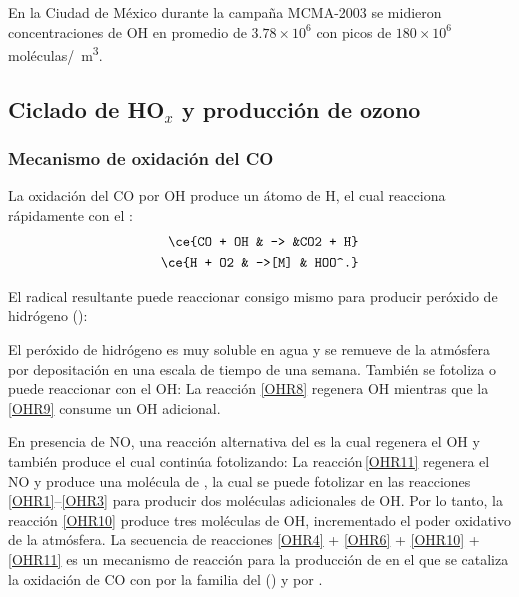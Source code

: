 En la Ciudad de M\'exico durante la campa\~na \gls{MCMA}-2003 se midieron concentraciones de OH en promedio de  $3.78\times10^6$ con picos de $180\times10^6$ mol\'eculas/\si{\centi\cubic\metre}.

\subsection{Ciclado de HO$_x$ y producci\'on de ozono}
\subsubsection{Mecanismo de oxidaci\'on del CO}\label{ciclado}

La oxidaci\'on del CO por OH produce un \'atomo de H, el cual reacciona r\'apidamente con el :
\begin{eqnarray}
\ce{CO + OH & -> &CO2 + H} \label{OHR4}  \\
\ce{H + O2  & ->[M]  & HOO^.}  \label{OHR6} 
\end{eqnarray}

El radical resultante  puede reaccionar consigo mismo para producir per\'oxido de hidr\'ogeno ():


El per\'oxido de hidr\'ogeno es muy soluble en agua y se remueve de la atm\'osfera por depositaci\'on en una escala de tiempo de una semana. Tambi\'en  se  fotoliza o puede  reaccionar con el OH:
La reacci\'on \ref{OHR8} regenera OH mientras que la \ref{OHR9} consume un OH adicional.

En presencia de NO, una reacci\'on alternativa del  es
la cual regenera el OH y tambi\'en produce  el cual contin\'ua fotolizando:
La reacci\'on\,\ref{OHR11} regenera el NO y produce una mol\'ecula de , la cual se puede fotolizar en las reacciones \ref{OHR1}--\ref{OHR3} para producir dos mol\'eculas adicionales de OH. Por lo tanto, la reacci\'on \ref{OHR10} produce tres mol\'eculas de OH, incrementado el poder oxidativo de la atm\'osfera. La secuencia de reacciones \ref{OHR4} + \ref{OHR6} + \ref{OHR10} + \ref{OHR11} es un mecanismo de reacci\'on para la producci\'on de  en el que se cataliza la oxidaci\'on de CO con  por la familia del   ()  y por .

